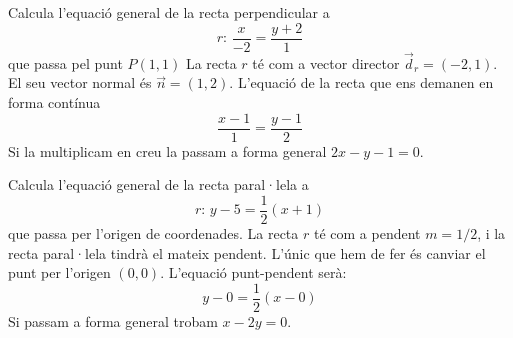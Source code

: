 \begin{resolt}[E]{Calcula l'equació general de la recta perpendicular a \[r:\, \frac{x}{-2}=\frac{y+2}{1}\] que passa pel punt $P(1,1)$}
		La recta $r$ té com a vector director $\vec d_r=(-2,1)$. El seu vector normal és $\vec n=(1,2)$. L'equació de la recta que ens demanen en forma contínua 
		\begin{equation*}
				\frac{x-1}{1}=\frac{y-1}{2}
		\end{equation*}
		Si la multiplicam en creu la passam a forma general $2x-y-1=0$.
\end{resolt}	
\begin{resolt}{Calcula l'equació general de la recta paral·lela a \[r:\, y-5=\frac{1}{2}(x+1)\] que passa per l'origen de coordenades.}
	La recta $r$ té com a pendent $m=1/2$, i la recta paral·lela tindrà el mateix pendent. L'únic que hem de fer és canviar el punt per l'origen $(0,0)$. L'equació punt-pendent serà:
	\begin{equation*}
		y-0=\frac{1}{2}(x-0)
	\end{equation*}
	Si passam a forma general trobam $x-2y=0$.
\end{resolt}


